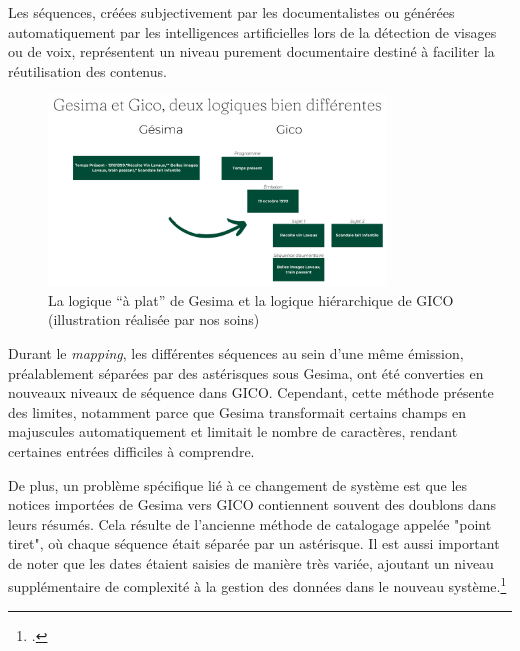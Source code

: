 	Les séquences, créées subjectivement par les documentalistes ou générées automatiquement par les intelligences artificielles lors de la détection de visages ou de voix, représentent un niveau purement documentaire destiné à faciliter la réutilisation des contenus.
	
	\begin{figure}[h!]
		\centering
		\includegraphics[width=0.8\textwidth]{images/gesimavsgico.png}
		\caption{La logique \enquote{à plat} de Gesima et la logique hiérarchique de GICO (illustration réalisée par nos soins)}
		\label{fig:image1}
	\end{figure}
	
	
	Durant le \emph{mapping}, les différentes séquences au sein d'une même émission, préalablement séparées par des astérisques sous Gesima, ont été converties en nouveaux niveaux de séquence dans GICO. Cependant, cette méthode présente des limites, notamment parce que Gesima transformait certains champs en majuscules automatiquement et limitait le nombre de caractères, rendant certaines entrées difficiles à comprendre.
	
	De plus, un problème spécifique lié à ce changement de système est que les notices importées de Gesima vers GICO contiennent souvent des doublons dans leurs résumés. Cela résulte de l'ancienne méthode de catalogage appelée "point tiret", où chaque séquence était séparée par un astérisque. Il est aussi important de noter que les dates étaient saisies de manière très variée, ajoutant un niveau supplémentaire de complexité à la gestion des données dans le nouveau système.\footcite{sonderegger2024}



